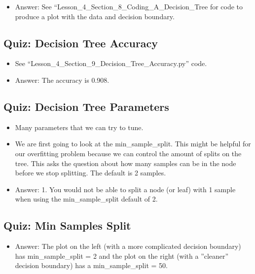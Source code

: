 \documentclass[12pt]{report}
\begin{document}
\begin{itemize}

\item Answer: See ``Lesson\_4\_Section\_8\_Coding\_A\_Decision\_Tree for code to produce a plot with the data and decision boundary. 

\end{itemize}

\subsection{Quiz: Decision Tree Accuracy}

\begin{itemize}

\item See ``Lesson\_4\_Section\_9\_Decision\_Tree\_Accuracy.py'' code. 

\item Answer: The accuracy is 0.908.

\end{itemize}

\subsection{Quiz: Decision Tree Parameters}

\begin{itemize}

\item Many parameters that we can try to tune. 

\item We are first going to look at the min\_sample\_split. This might be helpful for our overfitting problem because we can control the amount of splits on the tree. This asks the question about how many samples can be in the node before we stop splitting. The default is 2 samples. 

\item Answer: 1. You would not be able to split a node (or leaf) with 1 sample when using the min\_sample\_split default of 2. 

\end{itemize}

\subsection{Quiz: Min Samples Split}

\begin{itemize}

\item Answer: The plot on the left (with a more complicated decision boundary) has min\_sample\_split = 2 and the plot on the right (with a ''cleaner'' decision boundary) has a  min\_sample\_split = 50. 

\end{itemize}
\end{document}
